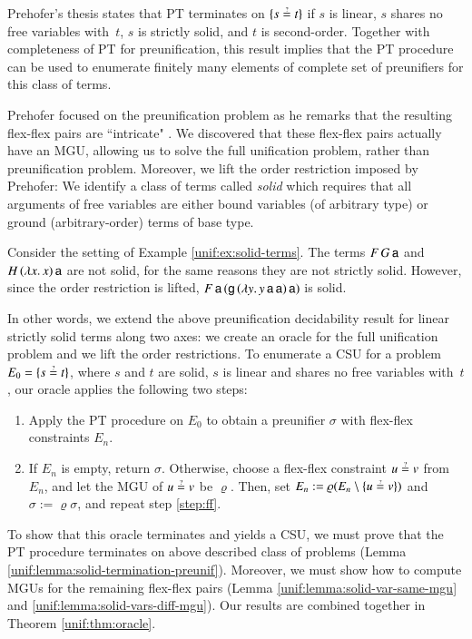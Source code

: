 Prehofer's thesis states that PT terminates on $\{s \unif t\}$
if $s$ is linear, $s$ shares no free variables with~$t$, $s$ is strictly solid,
and $t$ is second-order. Together with completeness of PT for preunification,
this result implies that the PT procedure can be used to enumerate finitely many
elements of complete set of preunifiers for this class of terms.

Prehofer focused on the preunification problem as he remarks that the resulting
flex-flex pairs are ``intricate" \cite[Sect.~5.2.2]{cp-95-unifphd}. We discovered that these flex-flex
pairs actually have an MGU, allowing us to solve the full unification problem,
rather than preunification problem. Moreover, we lift the order restriction
imposed by Prehofer: We identify a class of terms called \emph{solid} which
requires that all arguments of free variables are either bound variables (of
arbitrary type) or ground (arbitrary-order) terms of base type.

\begin{exa}
  Consider the setting of Example \ref{unif:ex:solid-terms}. The terms $F \, G \,
  \mathsf{a}$ and $H \, (\lambda x. \, x) \, \mathsf{a}$ are not solid, for the same reasons they are not strictly solid.
  However, since the order restriction is lifted, $F \, \mathsf{a} \, (\mathsf{g} \, (\lambda y. \,
  y\,\mathsf{a}\,\mathsf{a})  \, \mathsf{a})$ is solid.
\end{exa}


In other words, we extend the above preunification decidability result
for linear strictly solid terms along two axes: we create an oracle
for the full unification problem and we lift the
order restrictions.
%
To enumerate a CSU for a problem $E_0 = \{s \unif t\}$, where $s$ and $t$ are solid,
$s$ is linear and shares no free variables with~$t$, our oracle applies the following two steps:
\begin{enumerate}
  \item Apply the PT procedure on $E_0$ to obtain a preunifier $\sigma$ with
  flex-flex constraints $E_n$.
  \item\label{step:ff} If $E_n$ is empty, return $\sigma$. Otherwise, choose a flex-flex constraint $u \unif v$ from $E_n$, and let the MGU of $u \unif v$
  be $\varrho$. Then, set $E_n := \varrho(E_n \setminus \{ u \unif v \})$ and
   $\sigma := \varrho\sigma$, and repeat step \ref{step:ff}.
\end{enumerate}

To show that this oracle terminates and yields a CSU, we must prove that the PT
procedure terminates on above described class of problems (Lemma
\ref{unif:lemma:solid-termination-preunif}). Moreover, we must show how to compute MGUs for
the remaining flex-flex pairs (Lemma \ref{unif:lemma:solid-var-same-mgu} and
\ref{unif:lemma:solid-vars-diff-mgu}). Our results are combined together in Theorem
\ref{unif:thm:oracle}.



